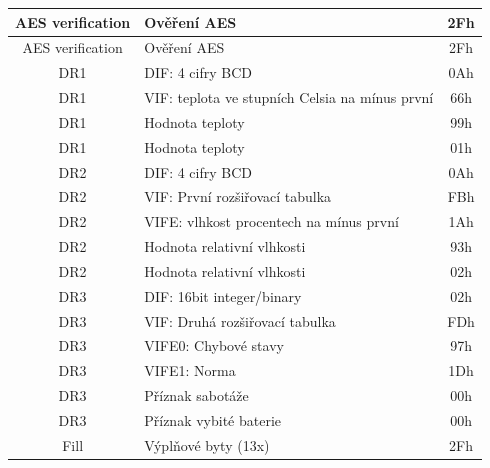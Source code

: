 \begin{table}[!ht]
{\begin{tabular}{|c|l|c|}
AES verification   & Ověření AES                                  & 2Fh              \\ \hline
AES verification   & Ověření AES                                  & 2Fh              \\ \hline
DR1                & DIF: 4 cifry BCD                               & 0Ah              \\ \hline
DR1                & VIF: teplota ve stupních Celsia na mínus první & 66h              \\ \hline
DR1                & Hodnota teploty                                & 99h              \\ \hline
DR1                & Hodnota teploty                                & 01h              \\ \hline
DR2                & DIF: 4 cifry BCD                               & 0Ah              \\ \hline
DR2                & VIF: První rozšiřovací tabulka                 & FBh              \\ \hline
DR2                & VIFE: vlhkost procentech na mínus první        & 1Ah              \\ \hline
DR2                & Hodnota relativní vlhkosti                               & 93h              \\ \hline
DR2                & Hodnota relativní vlhkosti                               & 02h              \\ \hline
DR3                & DIF: 16bit integer/binary                      & 02h              \\ \hline
DR3                & VIF: Druhá rozšiřovací tabulka                 & FDh              \\ \hline
DR3                & VIFE0: Chybové stavy                           & 97h              \\ \hline
DR3                & VIFE1: Norma 																	& 1Dh              \\ \hline
DR3                & Příznak sabotáže                               & 00h              \\ \hline
DR3                & Příznak vybité baterie                         & 00h              \\ \hline
Fill               & Výplňové byty (13x)                                 & 2Fh              \\ \hline \hline
\end{tabular}}
\end{table}

